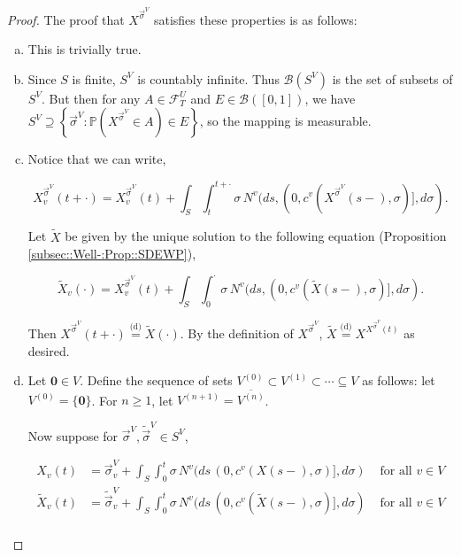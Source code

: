 \documentclass[12pt]{article}
\newcommand{\mb}{\mathbb}
\newcommand{\mc}{\mathcal}
\newcommand{\ms}{\mathscr}
\newcommand{\ov}{\overline}
\newcommand{\te}{\text}
\newcommand{\ind}{\hspace{24pt}}
\newcommand{\pr}{\mb{P}}							%
\newcommand{\deq}{\overset{\text{(d)}}{=}}			%
\renewcommand{\root}{\mathbf{0}}				%
\renewcommand{\v}{v}							%
\renewcommand{\U}{U}							%
\renewcommand{\S}{S}							%
\newcommand{\s}{\sigma}							%
\newcommand{\sv}{\vec{\s}}						%
\newcommand{\T}{T}								%
\renewcommand{\t}{t}							%
\renewcommand{\tt}{s}							%
\newcommand{\F}{\mc{F}}							%
\newcommand{\X}{X}								%
\newcommand{\IGr}{c}							%
\newcommand{\vind}[1]{^{#1}}					%
\newcommand{\carp}[1]{^{#1}}					%
\newcommand{\vsi}[1]{^{#1}}						%
\newcommand{\cind}[1]{_{#1}}					%
\newcommand{\cl}{\ov}							%
\newcommand{\tp}[1]{(#1)}						%
\newcommand{\ts}[1]{_{#1}}						%
\newcommand{\sln}[1]{^{(#1)}}					%
\newcommand{\poiss}{N}							%
\newcommand{\alt}[1]{\widetilde{#1}}			%
\newcommand{\pst}[1]{^{#1}}						%
\begin{document}
\begin{proof}
The proof that \(\X\pst{\sv\vsi{V}}\) satisfies these properties is as follows:

\begin{enumerate}[(a)]
\item This is trivially true.

\item Since \(\S\) is finite, \(\S\carp{V}\) is countably infinite. Thus \(\ms{B}(\S\carp{V})\) is the set of subsets of \(\S\carp{V}\). But then for any \(A \in \F\vsi{\U}\ts{\T}\) and \(E \in \ms{B}([0,1])\), we have \(\S\carp{V} \supseteq \left\{\sv\vsi{V}: \pr\left(\X\pst{\sv\vsi{V}} \in A\right) \in E\right\}\), so the mapping is measurable.

\item Notice that we can write,

\[\X\pst{\sv\vsi{V}}\cind{\v}\tp{\t+\cdot} = \X\pst{\sv\vsi{V}}\cind{\v}\tp{\t} + \int_\S\int_{\t}^{\t+\cdot} \s\,\poiss\vind{\v}(d\tt,(0,\IGr\vind{\v}(\X\pst{\sv\vsi{V}}\tp{\tt-},\s)],d\s).\]

Let \(\alt{\X}\) be given by the unique solution to the following equation (Proposition \ref{subsec::Well-:Prop::SDEWP}),

\[\alt{\X}\cind{\v}\tp{\cdot} = \X\pst{\sv\vsi{V}}\cind{\v}\tp{\t} + \int_\S \int_0^\cdot \s\,\poiss\vind{\v}(d\tt,(0,\IGr\vind{\v}(\alt{\X}\tp{\tt-},\s)],d\s).\]

Then \(\X\pst{\sv\vsi{V}}\tp{\t+\cdot} \deq \alt{\X}\tp{\cdot}\). By the definition of \(\X\pst{\sv\vsi{V}}\), \(\alt{\X} \deq \X\pst{\X\pst{\sv\vsi{V}}\tp{\t}}\) as desired.

\item Let \(\root \in V\). Define the sequence of sets \(V\sln{0}\subset V\sln{1}\subset \cdots \subseteq V\) as follows: let \(V\sln{0} = \{\root\}\). For \(n \geq 1\), let \(V\sln{n+1} = \cl{V\sln{n}}\).

\ind Now suppose for \(\sv\vsi{V},\alt{\sv}\vsi{V}\in \S\carp{V}\),

\begin{align*}
\X\cind{\v}\tp{\t} &= \sv\cind{\v}\vsi{V} + \int_\S\int_0^\t \s\,\poiss\vind{\v}(d\tt\,(0,\IGr\vind{\v}(\X\tp{\tt-},\s)],d\s)&\te{ for all } \v \in V\\
\alt{\X}\cind{\v}\tp{\t} &= \alt{\sv}\cind{\v}\vsi{V} + \int_\S\int_0^\t \s\,\poiss\vind{\v}(d\tt\,(0,\IGr\vind{\v}(\alt{\X}\tp{\tt-},\s)],d\s)&\te{ for all } \v \in V\\
\end{align*}


\end{enumerate}
\end{proof}
\end{document}
